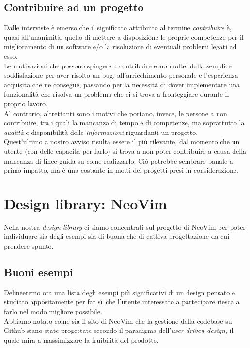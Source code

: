 \documentclass[12pt]{article} %
\begin{document}
\subsection{Contribuire ad un progetto}
\label{motivi}
Dalle interviste \`e emerso che il significato attribuito al termine \emph{contribuire} \`e, quasi all'unanimit\`a, quello di mettere a disposizione le proprie competenze per il miglioramento di un software e/o la risoluzione di eventuali problemi legati ad esso.\\
Le motivazioni che possono spingere a contribuire sono molte: dalla semplice soddisfazione per aver risolto un bug, all'arricchimento personale e l'esperienza acquisita che ne consegue, passando per la necessit\`a di dover implementare una funzionalit\`a che risolva un problema che ci si trova a fronteggiare durante il proprio lavoro.\\
Al contrario, altrettanti sono i motivi che portano, invece, le persone a non contribuire, tra i quali la mancanza di tempo e di competenze, ma soprattutto la \emph{qualit\`a} e disponibilit\`a delle \emph{informazioni} riguardanti un progetto.\\
Quest'ultimo a nostro avviso risulta essere il pi\`u rilevante, dal momento che un utente (con delle capacit\`a per farlo) si trova a non poter contribuire a causa della mancanza di linee guida su come realizzarlo. Ci\`o potrebbe sembrare banale a primo impatto, ma \`e una costante in molti dei progetti presi in considerazione.

\newpage

\section{Design library: NeoVim}
Nella nostra \emph{design library} ci siamo concentrati sul progetto di NeoVim per poter individuare sia degli esempi sia di buona che di cattiva progettazione da cui prendere spunto.\\

\subsection{Buoni esempi}
Delineeremo ora una lista degli esempi pi\`u significativi di un design pensato e studiato appositamente per far s\`\i\ che l'utente interessato a partecipare riesca a farlo nel modo migliore possibile.\\
Abbiamo notato come sia il sito di NeoVim che la gestione della codebase su Github siano state progettate secondo il paradigma dell'\emph{user driven design}, il quale mira a massimizzare la fruibilit\`a del prodotto.
\end{document}
